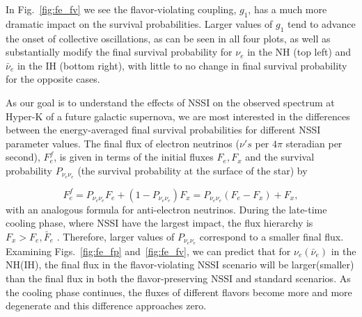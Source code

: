 \documentclass[a4paper,12pt]{article}
\begin{document}
In Fig.~\ref{fig:fe_fv} we see the flavor-violating coupling, $g_{1}$, has a much more dramatic impact on the survival probabilities. Larger values of $g_{1}$ tend to advance the onset of collective oscillations, as can be seen in all four plots, as well as substantially modify the final survival probability for $\nu_{e}$ in the NH (top left) and $\bar{\nu}_{e}$ in the IH (bottom right), with little to no change in final survival probability for the opposite cases. 

As our goal is to understand the effects of NSSI on the observed spectrum at Hyper-K of a future galactic supernova, we are most interested in the differences between the energy-averaged final survival probabilities for different NSSI parameter values. The final flux of electron neutrinos ($\nu's$ per $4\pi$ steradian per second), $F^{f}_{e}$, is given in terms of the initial fluxes $F_{e}, F_{x}$ and the survival probability $P_{\nu_{e}\nu_{e}}$ (the survival probability at the surface of the star)  by 

\begin{equation}
F^{f}_{e} = P_{\nu_{e}\nu_{e}}F_{e} + (1-P_{\nu_{e}\nu_{e}})F_{x} = P_{\nu_{e}\nu_{e}}(F_{e} - F_{x}) + F_{x},
\end{equation}
with an analogous formula for anti-electron neutrinos. During the late-time cooling phase, where NSSI have the largest impact, the flux hierarchy is $F_{x} > F_{e},\bar{F}_{e}$ \cite{Nakazato:2012qf}. Therefore, larger values of $P_{\nu_{e}\nu_{e}}$ correspond to a smaller final flux. Examining Figs.~\ref{fig:fe_fp} and~\ref{fig:fe_fv}, we can predict that for $\nu_{e}(\bar{\nu}_{e})$ in the NH(IH), the final flux in the flavor-violating NSSI scenario will be larger(smaller) than the final flux in both the flavor-preserving NSSI and standard scenarios. As the cooling phase continues, the fluxes of different flavors become more and more degenerate and this difference approaches zero. 
\end{document}
